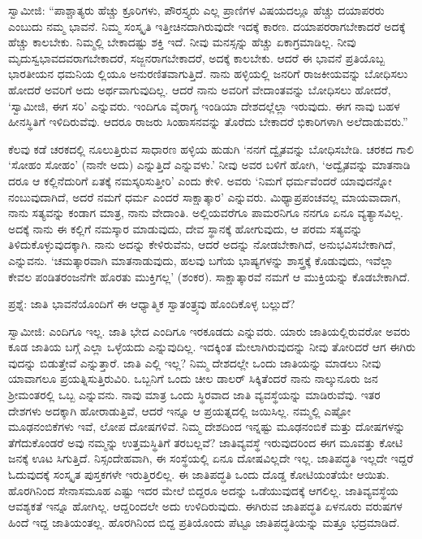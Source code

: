 ಸ್ವಾಮೀಜಿ: “ಪಾಶ್ಚಾತ್ಯರು ಹೆಚ್ಚು ಕ್ರೂರಿಗಳು, ಪೌರಸ್ತ್ಯರು ಎಲ್ಲ ಪ್ರಾಣಿಗಳ ವಿಷಯದಲ್ಲೂ ಹೆಚ್ಚು ದಯಾಪರರು ಎಂಬುದು ನಮ್ಮ ಭಾವನೆ. ನಿಮ್ಮ ಸಂಸ್ಕೃತಿ ಇತ್ತೀಚಿನದಾಗಿರುವುದೇ ಇದಕ್ಕೆ ಕಾರಣ. ದಯಾಪರರಾಗಬೇಕಾದರೆ ಅದಕ್ಕೆ ಹೆಚ್ಚು ಕಾಲಬೇಕು. ನಿಮ್ಮಲ್ಲಿ ಬೇಕಾದಷ್ಟು ಶಕ್ತಿ ಇದೆ. ನೀವು ಮನಸ್ಸನ್ನು ಹೆಚ್ಚು ಏಕಾಗ್ರಮಾಡಿಲ್ಲ. ನೀವು ಮೃದುಸ್ವಭಾವದವರಾಗಬೇಕಾದರೆ, ಸಜ್ಜನರಾಗಬೇಕಾದರೆ, ಅದಕ್ಕೆ ಕಾಲಬೇಕು. ಆದರೆ ಈ ಭಾವನೆ ಪ್ರತಿಯೊಬ್ಬ ಭಾರತೀಯನ ಧಮನಿಯ ಲ್ಲಿಯೂ ಅನುರಣಿತವಾಗುತ್ತಿದೆ. ನಾನು ಹಳ್ಳಿಯಲ್ಲಿ ಜನರಿಗೆ ರಾಜಕೀಯವನ್ನು ಬೋಧಿಸಲು ಹೋದರೆ ಅವರಿಗೆ ಅದು ಅರ್ಥವಾಗುವುದಿಲ್ಲ. ಆದರೆ ನಾನು ಅವರಿಗೆ ವೇದಾಂತವನ್ನು ಬೋಧಿಸಲು ಹೋದರೆ, ‘ಸ್ವಾಮೀಜಿ, ಈಗ ಸರಿ’ ಎನ್ನುವರು. ಇಂದಿಗೂ ವೈರಾಗ್ಯ ಇಂಡಿಯಾ ದೇಶದಲ್ಲೆಲ್ಲಾ ಇರುವುದು. ಈಗ ನಾವು ಬಹಳ ಹೀನಸ್ಥಿತಿಗೆ ಇಳಿದಿರುವೆವು. ಆದರೂ ರಾಜರು ಸಿಂಹಾಸನವನ್ನು ತೊರೆದು ಬೇಕಾದರೆ ಭಿಕಾರಿಗಳಾಗಿ ಅಲೆದಾಡುವರು.”

ಕೆಲವು ಕಡೆ ಚರಕದಲ್ಲಿ ನೂಲುತ್ತಿರುವ ಸಾಧಾರಣ ಹಳ್ಳಿಯ ಹುಡುಗಿ ‘ನನಗೆ ದ್ವೈತವನ್ನು ಬೋಧಿಸಬೇಡಿ. ಚರಕದ ಗಾಲಿ ‘ಸೋಹಂ ಸೋಹಂ’ (ನಾನೇ ಅದು) ಎನ್ನುತ್ತಿದೆ ಎನ್ನುವಳು.’ ನೀವು ಅವರ ಬಳಿಗೆ ಹೋಗಿ, ‘ಅದ್ವೈತವನ್ನು ಮಾತನಾಡಿ ದರೂ ಆ ಕಲ್ಲಿನೆದುರಿಗೆ ಏತಕ್ಕೆ ನಮಸ್ಕರಿಸುತ್ತೀರಿ’ ಎಂದು ಕೇಳಿ. ಅವರು ‘ನಿಮಗೆ ಧರ್ಮವೆಂದರೆ ಯಾವುದನ್ನೋ ನಂಬುವುದಾಗಿದೆ, ಅದರೆ ನಮಗೆ ಧರ್ಮ ಎಂದರೆ ಸಾಕ್ಷಾತ್ಕಾರ’ ಎನ್ನುವರು. ಮಿಥ್ಯಾಪ್ರಪಂಚವಲ್ಲ ಮಾಯವಾದಾಗ, ನಾನು ಸತ್ಯವನ್ನು ಕಂಡಾಗ ಮಾತ್ರ, ನಾನು ವೇದಾಂತಿ. ಅಲ್ಲಿಯವರೆಗೂ ಪಾಮರನಿಗೂ ನನಗೂ ಏನೂ ವ್ಯತ್ಯಾಸವಿಲ್ಲ. ಅದಕ್ಕೆ ನಾನು ಈ ಕಲ್ಲಿಗೆ ನಮಸ್ಕಾರ ಮಾಡುವುದು, ದೇವ ಸ್ಥಾನಕ್ಕೆ ಹೋಗುವುದು, ಆ ಪರಮ ಸತ್ಯವನ್ನು ತಿಳಿದುಕೊಳ್ಳುವುದಕ್ಕಾಗಿ. ನಾನು ಅದನ್ನು ಕೇಳಿರುವೆನು, ಆದರೆ ಅದನ್ನು ನೋಡಬೇಕಾಗಿದೆ, ಅನುಭವಿಸಬೇಕಾಗಿದೆ, ಎನ್ನುವನು. ‘ಚಮತ್ಕಾರವಾಗಿ ಮಾತನಾಡುವುದು, ಹಲವು ಬಗೆಯ ಭಾಷ್ಯಗಳನ್ನು ಶಾಸ್ತ್ರಕ್ಕೆ ಕೊಡುವುದು, ಇವೆಲ್ಲಾ ಕೇವಲ ಪಂಡಿತರಂಜನೆಗೇ ಹೊರತು ಮುಕ್ತಿಗಲ್ಲ’ (ಶಂಕರ). ಸಾಕ್ಷಾತ್ಕಾರವೆ ನಮಗೆ ಆ ಮುಕ್ತಿಯನ್ನು ಕೊಡಬೇಕಾಗಿದೆ.

ಪ್ರಶ್ನೆ: ಜಾತಿ ಭಾವನೆಯೊಂದಿಗೆ ಈ ಆಧ್ಯಾತ್ಮಿಕ ಸ್ವಾತಂತ್ರ್ಯವು ಹೊಂದಿಕೊಳ್ಳ ಬಲ್ಲುದೆ?

ಸ್ವಾಮೀಜಿ: ಎಂದಿಗೂ ಇಲ್ಲ. ಜಾತಿ ಭೇದ ಎಂದಿಗೂ ಇರಕೂಡದು ಎನ್ನುವರು. ಯಾರು ಜಾತಿಯಲ್ಲಿರುವರೋ ಅವರು ಕೂಡ ಜಾತಿಯ ಬಗ್ಗೆ ಎಲ್ಲಾ ಒಳ್ಳೆಯದು ಎನ್ನುವುದಿಲ್ಲ. ಇದಕ್ಕಿಂತ ಮೇಲಾಗಿರುವುದನ್ನು ನೀವು ತೋರಿದರೆ ಆಗ ಈಗಿರು ವುದನ್ನು ಬಿಡುತ್ತೇವೆ ಎನ್ನುತ್ತಾರೆ. ಜಾತಿ ಎಲ್ಲಿ ಇಲ್ಲ? ನಿಮ್ಮ ದೇಶದಲ್ಲೇ ಒಂದು ಜಾತಿಯನ್ನು ಮಾಡಲು ನೀವು ಯಾವಾಗಲೂ ಪ್ರಯತ್ನಿಸುತ್ತಿರುವಿರಿ. ಒಬ್ಬನಿಗೆ ಒಂದು ಚೀಲ ಡಾಲರ್​ ಸಿಕ್ಕಿತೆಂದರೆ ನಾನು ನಾಲ್ಕುನೂರು ಜನ ಶ‍್ರೀಮಂತರಲ್ಲಿ ಒಬ್ಬ ಎನ್ನುವನು. ನಾವು ಮಾತ್ರ ಒಂದು ಸ್ಥಿರವಾದ ಜಾತಿ ವ್ಯವಸ್ಥೆಯನ್ನು ಮಾಡಿರುವೆವು. ಇತರ ದೇಶಗಳು ಅದಕ್ಕಾಗಿ ಹೋರಾಡುತ್ತಿವೆ, ಆದರೆ ಇನ್ನೂ ಆ ಪ್ರಯತ್ನದಲ್ಲಿ ಜಯಿಸಿಲ್ಲ. ನಮ್ಮಲ್ಲಿ ಎಷ್ಟೋ ಮೂಢನಂಬಿಕೆಗಳು ಇವೆ, ಲೋಪ ದೋಷಗಳಿವೆ. ನಿಮ್ಮ ದೇಶದಿಂದ ಇನ್ನಷ್ಟು ಮೂಢನಂಬಿಕೆ ಮತ್ತು ದೋಷಗಳನ್ನು ತೆಗೆದುಕೊಂಡರೆ ಅವು ನಮ್ಮನ್ನು ಉತ್ತಮಸ್ಥಿತಿಗೆ ತರಬಲ್ಲವೆ? ಜಾತಿವ್ಯವಸ್ಥೆ ಇರುವುದರಿಂದ ಈಗ ಮೂವತ್ತು ಕೋಟಿ ಜನಕ್ಕೆ ಊಟ ಸಿಗುತ್ತಿದೆ. ನಿಸ್ಸಂದೇಹವಾಗಿ, ಈ ಸಂಸ್ಥೆಯಲ್ಲಿ ಏನೂ ದೋಷವಿಲ್ಲದೇ ಇಲ್ಲ. ಜಾತಿಪದ್ಧತಿ ಇಲ್ಲದೇ ಇದ್ದರೆ ಓದುವುದಕ್ಕೆ ಸಂಸ್ಕೃತ ಪುಸ್ತಕಗಳೇ ಇರುತ್ತಿರಲಿಲ್ಲ. ಈ ಜಾತಿಪದ್ಧತಿ ಒಂದು ದೊಡ್ಡ ಕೋಟಿಯಂತೆಯೇ ಆಯಿತು. ಹೊರಗಿನಿಂದ ಸೇನಾಸಮೂಹ ಎಷ್ಟು ಇದರ ಮೇಲೆ ಬಿದ್ದರೂ ಅದನ್ನು ಒಡೆಯುವುದಕ್ಕೆ ಆಗಲಿಲ್ಲ. ಜಾತಿವ್ಯವಸ್ಥೆಯ ಆವಶ್ಯಕತೆ ಇನ್ನೂ ಹೋಗಿಲ್ಲ. ಆದ್ದರಿಂದಲೇ ಅದು ಉಳಿದಿರುವುದು. ಈಗಿರುವ ಜಾತಿಪದ್ಧತಿ ಏಳನೂರು ವರುಷಗಳ ಹಿಂದೆ ಇದ್ದ ಜಾತಿಯಂತಲ್ಲ. ಹೊರಗಿನಿಂದ ಬಿದ್ದ ಪ್ರತಿಯೊಂದು ಪೆಟ್ಟೂ ಜಾತಿಪದ್ಧತಿಯನ್ನು ಮತ್ತೂ ಭದ್ರಮಾಡಿದೆ.

